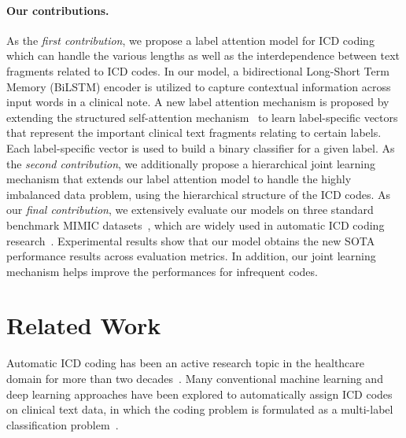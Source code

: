 \documentclass{article}
\begin{document}
\paragraph{Our contributions.} As the \emph{first contribution}, we propose a label attention model for ICD coding which can handle the various lengths as well as the interdependence between text fragments related to ICD codes. In our model, a bidirectional Long-Short Term Memory (BiLSTM) encoder is utilized to capture contextual information across input words in a clinical note. A new label attention mechanism is proposed by extending the structured self-attention mechanism~\cite{lin2017} to learn label-specific vectors that represent the important clinical text fragments relating to certain labels. Each label-specific vector is used to build a binary classifier for a given label. As the \emph{second contribution}, we additionally propose a hierarchical joint learning mechanism that extends our label attention model to handle the highly imbalanced data problem, using the hierarchical structure of the ICD codes. As our \emph{final contribution}, we extensively evaluate our models on three standard benchmark MIMIC datasets~\cite{lee2011open,johnson2016mimic}, which are widely used in automatic ICD coding research~\cite{perotte2013diagnosis,prakash2017condensed,mullenbach2018,xie2019ehr,li2020multirescnn}. Experimental results show that our model obtains the new SOTA performance results across evaluation metrics. In addition,  our joint learning mechanism helps improve the performances for infrequent codes. 



\section{Related Work}
Automatic ICD coding has been an active research topic in the healthcare domain for more than two decades~\cite{larkey1996combining,de1998hierarchical}. Many conventional machine learning and deep learning approaches have been explored to automatically assign ICD codes on clinical text data, in which the coding problem is formulated as a multi-label classification problem~\cite{perotte2013diagnosis,koopman2015automatic,karimi2017automatic,shi2017towards,mullenbach2018,xie2019ehr,li2020multirescnn}. 
\end{document}
